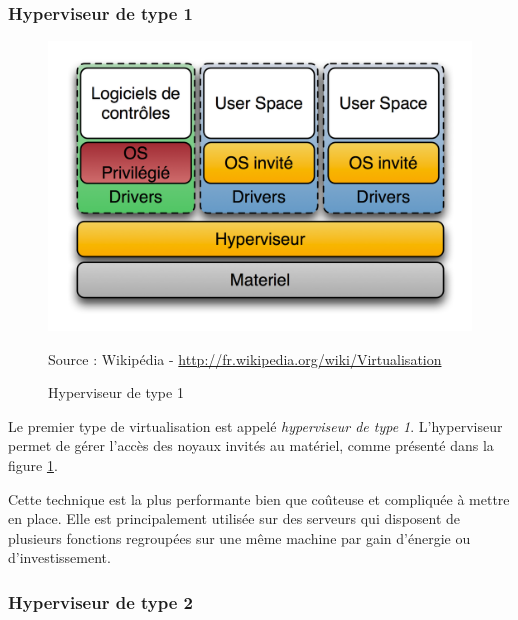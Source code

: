 \subsubsection{Hyperviseur de type 1}

\begin{figure}[!h]
	\center
	\includegraphics[scale=0.7]{img/Hyperviseur_type1.png}
	\caption{Hyperviseur de type 1}
	Source : Wikipédia - \href{http://fr.wikipedia.org/wiki/Virtualisation}{http://fr.wikipedia.org/wiki/Virtualisation}
	\label{Schéma Hyperviseur 1}
\end{figure}

Le premier type de virtualisation est appelé \textit{hyperviseur de type 1}.
L'hyperviseur permet de gérer l'accès des noyaux invités au matériel, comme présenté dans la figure \ref{Schéma Hyperviseur 1}.

Cette technique est la plus performante bien que coûteuse et compliquée à mettre en place.
Elle est principalement utilisée sur des serveurs qui disposent de plusieurs fonctions regroupées sur une même machine par gain d'énergie ou d'investissement.
\\




\subsubsection{Hyperviseur de type 2}

